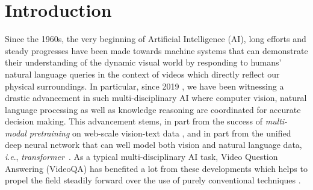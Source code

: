 \documentclass[runningheads]{llncs}
\newcommand{\ie}{\textit{i}.\textit{e}.}
\newcommand{\trans}{\emph{transformer}}
\begin{document}
\section{Introduction}
\label{introduction}
Since the 1960s, the very beginning of Artificial Intelligence (AI), long efforts and steady progresses have been made towards machine systems that can demonstrate their understanding of the dynamic visual world by responding to humans' natural language queries in the context of videos which directly reflect our physical surroundings. In particular, since 2019 \cite{devlin2018bert}, we have been witnessing a drastic advancement in such multi-disciplinary AI where computer vision, natural language processing as well as knowledge reasoning are coordinated for accurate decision making. This advancement stems, in part from the success of \emph{multi-modal pretraining} on web-scale vision-text data \cite{chen2020uniter,jia2021scaling,li2021align,li2020oscar,lu2019vilbert,radford2021learning,su2020vl,sun2019videobert,tan2019lxmert,xu2021videoclip}, and in part from the unified deep neural network that can well model both vision and natural language data, \ie, \trans~\cite{vaswani2017attention}. As a typical multi-disciplinary AI task, Video Question Answering (VideoQA) has benefited a lot from these developments which helps to propel the field steadily forward over the use of purely conventional techniques \cite{fan2019heterogeneous,gao2018motion,jang2017tgif,jiang2020reasoning,le2020hierarchical,xiao2021video,zhong2022video}.
\vspace{-0.1cm}
\end{document}
